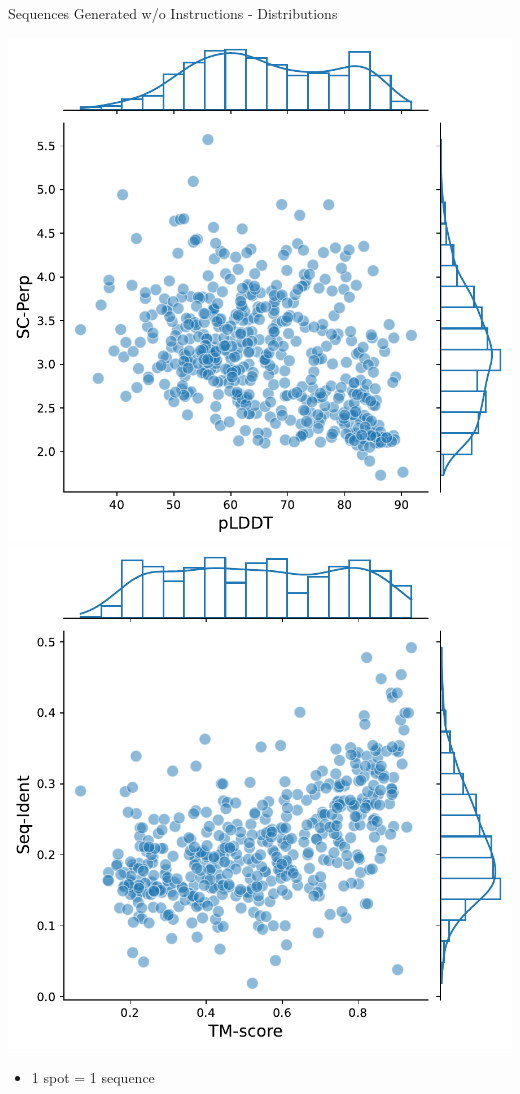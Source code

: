 \documentclass[dvipsnames]{beamer}
\begin{document}
\begin{frame}{Sequences Generated w/o Instructions - Distributions}
	\begin{center}
		\includegraphics[scale=0.35]{images/plddt_scperp.pdf}
		\includegraphics[scale=0.35]{images/tm_sid.pdf}
	\end{center}
	\begin{itemize}
		\item 1 spot = 1 sequence
	\end{itemize}
\end{frame}
\end{document}
